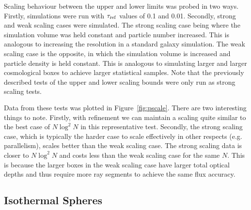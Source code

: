 \documentclass[fleq,usenatbib]{mnras}
\newcommand{\tr}{\tau_{\rm ref}}
\begin{document}
{Scaling behaviour between the upper and lower limits was probed in two ways. 
Firstly, simulations were run with $\tr$ values of 0.1 and 0.01. Secondly, 
strong and weak scaling cases were simulated. The strong scaling case being 
where the simulation volume was held constant and particle number increased. 
This is analogous to increasing the resolution in a standard galaxy 
simulation. The weak scaling case is the opposite, in which the simulation 
volume is increased and particle density is held constant. This is analogous 
to simulating larger and larger cosmological boxes to achieve larger 
statistical samples. Note that the previously described tests of the upper and 
lower scaling bounds were only run as strong scaling tests.

Data from these tests was plotted in Figure~\ref{fig:pscale}.  There
are two interesting things to note.  Firstly, with refinement we can
maintain a scaling quite similar to the best case of $N \log^2{N}$ in
this representative test.  Secondly, the strong scaling case, 
which is typically the harder case to scale effectively in other respects 
(e.g. parallelism), scales better than the weak scaling case. The strong 
scaling data is closer to $N\log^2{N}$ and costs less than the weak scaling 
case for the same $N$. This is because the larger boxes in the weak scaling 
case have larger total optical depths and thus require more ray segments to 
achieve the same flux accuracy.  

\subsection{Isothermal Spheres}\label{spheretest}
}
\end{document}

